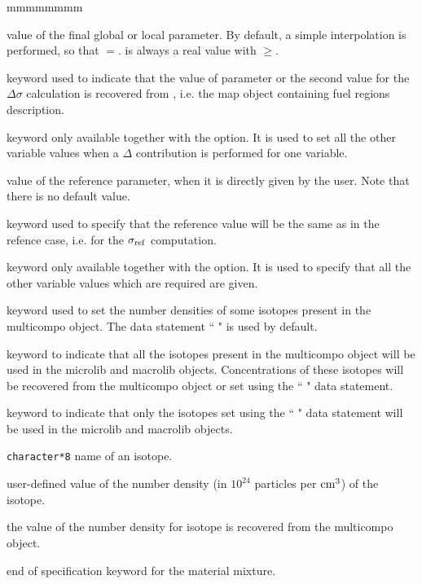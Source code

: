 \begin{ListeDeDescription}{mmmmmmmm}
\item[\dusa{val2}] value of the final global or local parameter. By default, a simple interpolation is performed, so that $=$.  is always a real value with $\ge$.

\item[\moc{MAP}] keyword used to indicate that the value of parameter  or the second value for the $\Delta\sigma$ calculation is
recovered from , i.e. the {\sc map} object containing fuel regions description.

\item[\moc{REF}] keyword only available together with the  option. It is used to set all the other variable values when a $\Delta$ contribution is performed for one variable.  

\item[\dusa{valref}] value of the reference parameter, when it is directly given by the user. Note that there is no default value.

\item[\moc{SAMEASREF}] keyword used to specify that the reference value will be the same as in the refence case, i.e. for the $\sigma_{\rm ref}$ computation.

\item[\moc{ENDREF}] keyword only available together with the  option. It is used to specify that all the other variable values which are required are given.  

\item[\moc{MICRO}] keyword used to set the number densities of some isotopes present in the {\sc multicompo} object. The data statement `` " is used by default.

\item[\moc{ALL}] keyword to indicate that all the isotopes present in the  {\sc multicompo} object will be used in the {\sc microlib} and {\sc macrolib} objects. Concentrations of these isotopes will be recovered from the {\sc multicompo} object
or set using the `` " data statement.

\item[\moc{ONLY}] keyword to indicate that only the isotopes set using the `` " data statement will be used in the {\sc microlib} and {\sc macrolib} objects.

\item[\dusa{HISO}] {\tt character*8} name of an isotope.

\item[\dusa{conc}] user-defined value of the number density (in $10^{24}$ particles per ${\rm cm}^3$) of the isotope.

\item[\moc{*}] the value of the number density for isotope  is recovered from the {\sc multicompo} object.

\item[\moc{ENDMIX}] end of specification keyword for the material mixture.

\end{ListeDeDescription}


